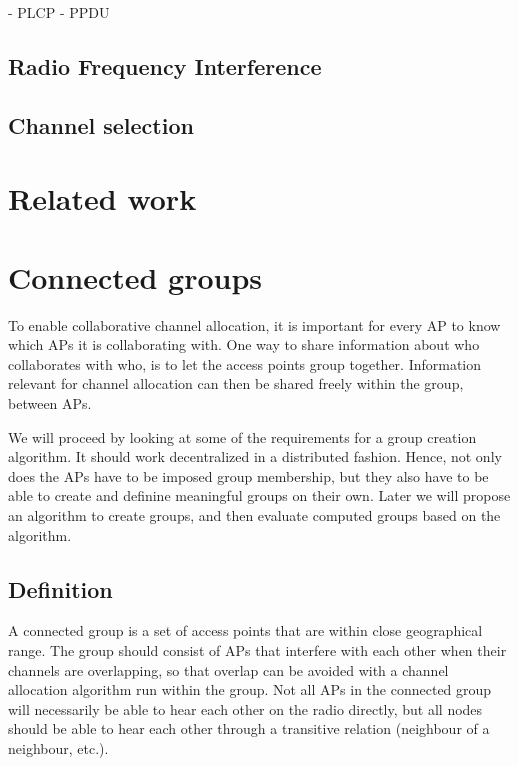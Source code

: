 \documentclass[a4paper,UKenglish]{report}
\begin{document}
- PLCP
- PPDU

\section{Radio Frequency Interference}



\section{Channel selection} 


\chapter{Related work}

\chapter{Connected groups}
To enable collaborative channel allocation, it is important for every AP to know which APs it is collaborating with.
One way to share information about who collaborates with who, is to let the access points group together. Information relevant for channel
allocation can then be shared freely within the group, between APs.

We will proceed by looking at some of the requirements for a group creation algorithm. It should work decentralized in a distributed fashion.
Hence, not only does the APs have to be imposed group membership, but they also have to be able to create and definine meaningful groups on their own.
Later we will propose an algorithm to create groups, and then evaluate computed groups based on the algorithm.


\section{Definition}
A connected group is a set of access points that are within close geographical range. The group should consist of APs that
interfere with each other when their channels are overlapping, so that overlap can be avoided with a channel allocation algorithm run within the group.
Not all APs in the connected group will necessarily be able to hear each other on the radio directly,
but all nodes should be able to hear each other through a transitive relation (neighbour of a neighbour, etc.).
\end{document}
